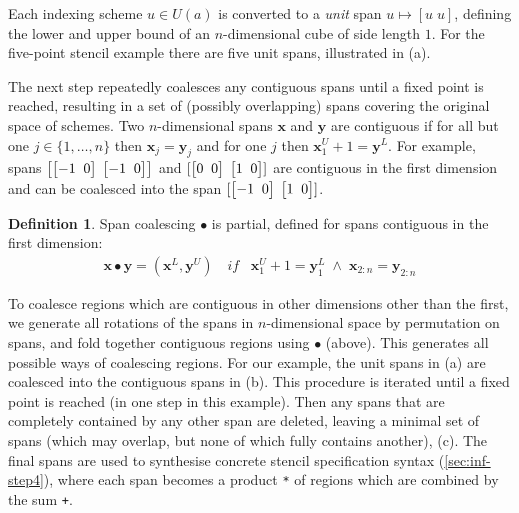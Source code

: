 \documentclass[10pt,preprint,numbers]{sigplanconf}
\newcounter{block}
\theoremstyle{definition}
\newtheorem{definition}[block]{Definition}
\newcommand{\vect}[1]{\textbf{#1}}
\newcommand{\vtwoh}[2]{\setlength{\arraycolsep}{0em}
\left[\begin{array}{cc}#1 \; & \; #2\end{array}\right]}
\begin{document}
\noindent
Each indexing scheme $u \in U(a)$ is converted to a \emph{unit} span
$u \mapsto [u \; u]$, defining the lower and upper bound of an
$n$-dimensional cube of side length $1$. For the five-point stencil
example there are five unit spans, illustrated in
(a).

The next step repeatedly coalesces any contiguous spans until a fixed
point is reached, resulting in a set of (possibly overlapping) spans
covering the original space of schemes. Two $n$-dimensional spans
$\vect{x}$ and $\vect{y}$ are contiguous if for all but one
$j \in \{1, \ldots, n\}$ then $\vect{x}_j = \vect{y}_j$ and for one
$j$ then $\vect{x}^U_1 + 1 = \vect{y}^L$. For example, spans
$\left[\vtwoh{-1}{0}\; \vtwoh{-1}{0}\right]$ and
$[\vtwoh{0}{0} \; \vtwoh{1}{0}]$ are contiguous in the first dimension
and can be coalesced into the span $[\vtwoh{-1}{0} \; \vtwoh{1}{0}]$.

\begin{definition}\label{def:span-coalesc}
  Span coalescing $\bullet$ is partial, defined for spans contiguous in the
  first dimension:
\begin{align*}
\vect{x} \bullet \vect{y}
= (\vect{x}^L, \vect{y}^U) \;\;\;\, \textit{if} \;\;\; \vect{x}^U_1 + 1 = \vect{y}^L_1 \; \wedge \;
\vect{x}_{2:n} = \vect{y}_{2:n} %
\end{align*}
\end{definition}
\noindent
To coalesce regions which are contiguous in other dimensions
other than the first, we generate all rotations of the spans in
$n$-dimensional space by permutation on spans, and fold together contiguous
regions using $\bullet$ (above). This
generates all possible ways of coalescing regions. For our example,
the unit spans in (a)
are coalesced into the contiguous spans in
(b).
This procedure is iterated until a fixed point is reached (in one step
in this example).
 Then any spans that are completely contained by any other span are deleted,
leaving a minimal set of spans (which may overlap, but none of which
fully contains another), (c).
The final spans are used to synthesise concrete stencil specification
syntax (\cref{sec:inf-step4}), where
each span becomes a product \texttt{*} of regions which are
combined by the sum \texttt{+}.
\end{document}
